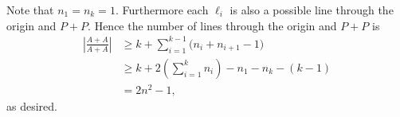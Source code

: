 Note that $n_1=n_k=1$. Furthermore each $\ell_i$ is also a possible line through the origin and $P+P$. Hence the number of lines through the origin and $P+P$ is
\begin{align*}
    \left\lvert\frac{A+A}{A+A}\right\rvert&\ge k+\sum_{i=1}^{k-1}\big(n_i+n_{i+1}-1\big)\\
    &\ge k+2\left(\sum_{i=1}^kn_i\right)-n_1-n_k-(k-1)\\
    &=2n^2-1,
\end{align*}
as desired.
